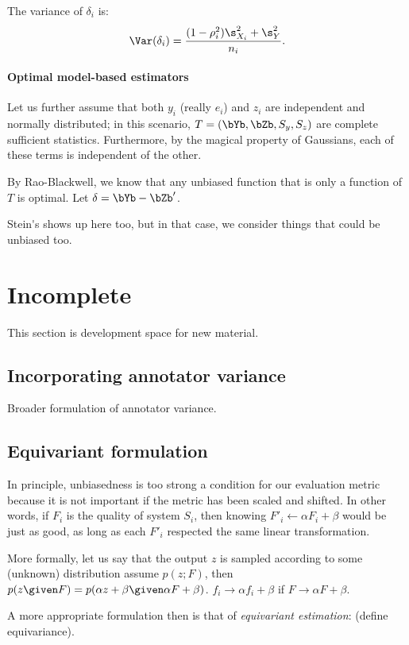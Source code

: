 The variance of $\delta_i$ is:
\[
\Var(\delta_i) = \frac{(1-\rho_i^2)\s^2_{X_i} + \s^2_Y}{n_i}.
\]

\paragraph{Optimal model-based estimators}

Let us further assume that both $y_i$ (really $e_i$) and $z_i$ are independent and normally distributed;
  in this scenario, $T = (\bYb, \bZb, S_y, S_z)$ are complete sufficient statistics.
Furthermore, by the magical property of Gaussians, each of these terms is independent of the other.

By Rao-Blackwell, we know that any unbiased function that is only a function of $T$ is optimal.
Let $\delta = \bYb - \bZb'$.

\ac{Stein's shows up here too, but in that case, we consider things that could be unbiased too.}

\section{\label{sec:incomplete}Incomplete}

This section is development space for new material.

\subsection{Incorporating annotator variance}
Broader formulation of annotator variance.

\subsection{Equivariant formulation}
In principle, unbiasedness is too strong a condition for our evaluation metric because it is not important if the metric has been scaled and shifted.
In other words, if $F_i$ is the quality of system $S_i$, then knowing $F'_i \gets \alpha F_i + \beta$ would be just as good, as long as each $F'_i$ respected the same linear transformation.

More formally, let us say that the output $z$ is sampled according to some (unknown) distribution assume $p(z; F)$, then $p(z\given F) = p(\alpha z + \beta \given \alpha F + \beta)$.
$f_i \to \alpha f_i + \beta$ if $F \to \alpha F + \beta$.

A more appropriate formulation then is that of \textit{equivariant estimation}:
(define equivariance).


